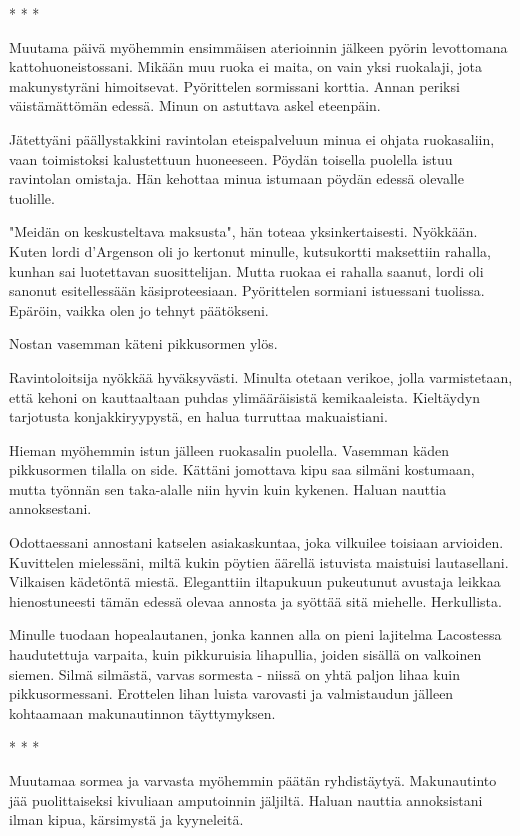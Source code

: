 * * *

Muutama päivä myöhemmin ensimmäisen aterioinnin jälkeen pyörin levottomana kattohuoneistossani. Mikään muu ruoka ei maita, on vain yksi ruokalaji, jota makunystyräni himoitsevat. Pyörittelen sormissani korttia. Annan periksi väistämättömän edessä. Minun on astuttava askel eteenpäin.


Jätettyäni päällystakkini ravintolan eteispalveluun minua ei ohjata ruokasaliin, vaan toimistoksi kalustettuun huoneeseen. Pöydän toisella puolella istuu ravintolan omistaja. Hän kehottaa minua istumaan pöydän edessä olevalle tuolille.


"Meidän on keskusteltava maksusta", hän toteaa yksinkertaisesti. Nyökkään. Kuten lordi d'Argenson oli jo kertonut minulle, kutsukortti maksettiin rahalla, kunhan sai luotettavan suosittelijan. Mutta ruokaa ei rahalla saanut, lordi oli sanonut esitellessään käsiproteesiaan. Pyörittelen sormiani istuessani tuolissa. Epäröin, vaikka olen jo tehnyt päätökseni.


Nostan vasemman käteni pikkusormen ylös.


Ravintoloitsija nyökkää hyväksyvästi. Minulta otetaan verikoe, jolla varmistetaan, että kehoni on kauttaaltaan puhdas ylimääräisistä kemikaaleista. Kieltäydyn tarjotusta konjakkiryypystä, en halua turruttaa makuaistiani.


Hieman myöhemmin istun jälleen ruokasalin puolella. Vasemman käden pikkusormen tilalla on side. Kättäni jomottava kipu saa silmäni kostumaan, mutta työnnän sen taka-alalle niin hyvin kuin kykenen. Haluan nauttia annoksestani.


Odottaessani annostani katselen asiakaskuntaa, joka vilkuilee toisiaan arvioiden. Kuvittelen mielessäni, miltä kukin pöytien äärellä istuvista maistuisi lautasellani. Vilkaisen kädetöntä miestä. Eleganttiin iltapukuun pukeutunut avustaja leikkaa hienostuneesti tämän edessä olevaa annosta ja syöttää sitä miehelle. Herkullista.


Minulle tuodaan hopealautanen, jonka kannen alla on pieni lajitelma Lacostessa haudutettuja varpaita, kuin pikkuruisia lihapullia, joiden sisällä on valkoinen siemen. Silmä silmästä, varvas sormesta - niissä on yhtä paljon lihaa kuin pikkusormessani. Erottelen lihan luista varovasti ja valmistaudun jälleen kohtaamaan makunautinnon täyttymyksen.






* * *

Muutamaa sormea ja varvasta myöhemmin päätän ryhdistäytyä. Makunautinto jää puolittaiseksi kivuliaan amputoinnin jäljiltä. Haluan nauttia annoksistani ilman kipua, kärsimystä ja kyyneleitä.


